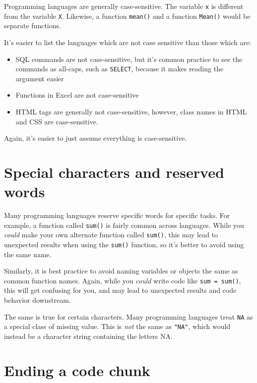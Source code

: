 \documentclass[
]{book}
\providecommand{\tightlist}{%
  \setlength{\itemsep}{0pt}\setlength{\parskip}{0pt}}
\begin{document}
Programming languages are generally case-sensitive. The variable \texttt{x} is
different from the variable \texttt{X}. Likewise, a
function \texttt{mean()} and a function \texttt{Mean()} would be separate functions.

It's easier to list the languages which are not case sensitive than those which are:

\begin{itemize}
\tightlist
\item
  SQL commands are not case-sensitive, but it's common practice to see the
  commands as all-caps, such as \texttt{SELECT}, because it makes reading the argument easier
\item
  Functions in Excel are not case-sensitive
\item
  HTML tags are generally not case-sensitive, however, class names in HTML and
  CSS are case-sensitive.
\end{itemize}

Again, it's easier to just assume everything is case-sensitive.

\section{Special characters and reserved words}\label{special-characters-and-reserved-words}

Many programming languages reserve specific words for specific tasks.
For example, a function called \texttt{sum()} is fairly common across
languages. While you \emph{could} make your own alternate function called
\texttt{sum()}, this may lead to unexpected results when using the \texttt{sum()}
function, so it's better to avoid using the same name.

Similarly, it is best practice to avoid naming variables or objects the
same as common function names. Again, while you \emph{could} write code like
\texttt{sum\ =\ sum()}, this will get confusing for you, and may lead to
unexpected results and code behavior downstream.

The same is true for certain characters. Many programming languages
treat \texttt{NA} as a special class of missing value. This is \emph{not} the same
as \texttt{"NA"}, which would instead be a character string containing the
letters NA.

\section{Ending a code chunk}\label{ending-a-code-chunk}
\end{document}
